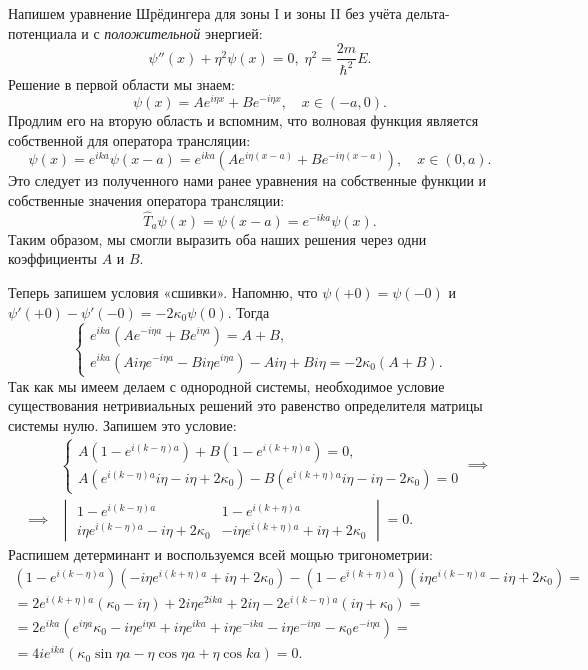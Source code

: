 Напишем уравнение Шрёдингера для зоны I и зоны II без учёта дельта-потенциала и
с \textit{положительной} энергией:
\[
  \psi''(x) + \eta^2\psi(x) = 0, \; \eta^2 = \frac{2m}{\hbar^2}E.
\]
Решение в первой области мы знаем:
\[
  \psi(x) = Ae^{i\eta x} + Be^{-i\eta x}, \quad x\in(-a, 0).
\]
Продлим его на вторую область и вспомним, что волновая функция является
собственной для оператора трансляции:
\[
  \psi(x) = e^{ika}\psi(x-a) = e^{ika}\left(Ae^{i\eta (x-a)} + Be^{-i\eta (x - a)}\right), \quad x\in(0, a).
\]
Это следует из полученного нами ранее уравнения на собственные функции и
собственные значения оператора трансляции:
\[
  \hat{T}_a\psi(x) = \psi(x-a) = e^{-i k a}\psi(x).
\]
Таким образом, мы смогли выразить оба наших решения через одни коэффициенты $A$
и $B$.

Теперь запишем условия «сшивки». Напомню, что $\psi(+0) = \psi(-0)$ и
$\psi'(+0) - \psi'(-0) = -2\kappa_0\psi(0)$. Тогда
\[
  \begin{cases}
    e^{ika}\left(Ae^{-i\eta a} + Be^{i\eta a}\right) = A + B,\\
    e^{ika}\left(A i \eta e^{-i\eta a} - B i \eta e^{i\eta a}\right) - Ai\eta + Bi\eta = -2\kappa_0(A+B).
  \end{cases}
\]
Так как мы имеем делаем с однородной системы, необходимое условие существования
нетривиальных решений это равенство определителя матрицы системы нулю. Запишем
это условие:
\begin{align*}
  &\begin{cases}
    A\left(1 - e^{i(k-\eta)a}\right) + B\left(1 - e^{i(k+\eta)a}\right) = 0,\\
    A \left(e^{i(k-\eta)a}i\eta - i\eta + 2\kappa_0\right) - B\left(e^{i(k+\eta)a}i\eta - i\eta - 2\kappa_0\right) = 0
  \end{cases} \implies\\
  \implies &\begin{vmatrix}
    1 - e^{i(k-\eta)a} & 1 - e^{i(k+\eta)a} \\
    i \eta e^{i(k-\eta)a} - i\eta + 2\kappa_0 & - i \eta e^{i (k +\eta) a} + i\eta + 2\kappa_0
  \end{vmatrix}
  = 0.
\end{align*}
Распишем детерминант и воспользуемся всей мощью тригонометрии:
\begin{gather*}
  \left(1 - e^{i(k-\eta)a}\right) \left(-i \eta e^{i (k + \eta) a} + i \eta + 2 \kappa_0\right) - \left(1 - e^{i (k + \eta) a}\right) \left(i \eta e^{i (k - \eta) a} - i \eta + 2 \kappa_0\right) = \\
  = 2 e^{i (k + \eta) a} (\kappa_0 - i \eta) + 2 i \eta e^{2 i k a} + 2 i \eta - 2 e^{i (k - \eta) a} (i \eta + \kappa_0) = \\
  = 2 e^{i k a} \left(e^{i \eta a} \kappa_0 - i \eta e^{i \eta a} + i \eta e^{i k a} + i \eta e^{-i k a} - i \eta e^{-i \eta a} - \kappa_0 e^{-i \eta a}\right) = \\
  = 4 i e^{i k a} \left(\kappa_0 \sin \eta a - \eta \cos \eta a + \eta \cos k a \right) = 0.
\end{gather*}
